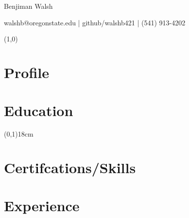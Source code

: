 \documentclass[12pt,letterpaper]{article}
\begin{document}
	\centering
	{\huge
		Benjiman Walsh
	}

	\vspace{0.5cm}

	walshb@oregonstate.edu |	
	github/walshb421 |
	(541) 913-4202

	\noindent
	\line(1,0){\textwidth}
	
	
	\raggedright

	\section*{Profile}

	
	\noindent
	\begin{minipage}[t]{0.5\linewidth}

	\section*{Education}

	

	\end{minipage}
	\begin{minipage}[t]{0.025\linewidth}
		
		\hspace{1cm}
	
	\end{minipage}
	\begin{minipage}[t][18cm][t]{0.025\linewidth}
		\hspace{1cm}
		\line(0,1){18cm}
		

	\end{minipage}
	\begin{minipage}[t]{0.4\linewidth}


	\section*{Certifcations/Skills}

	\section*{Experience}

	
	\end{minipage}
\end{document}
